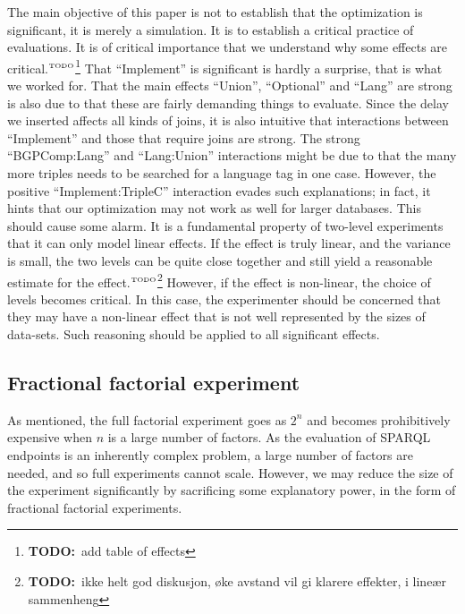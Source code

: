 \documentclass{article}
\newcommand{\todo}[1]{\ensuremath{^{\textrm{\tiny{TODO}\normalsize}}}\footnote{\textbf{TODO:}~#1}}
\begin{document}
The main objective of this paper is not to establish that the
optimization is significant, it is merely a simulation. It is to
establish a critical practice of evaluations. It is of critical
importance that we understand why some effects are critical.\todo{add
  table of effects} That
``Implement'' is significant is hardly a surprise, that is what we
worked for. That the main effects ``Union'', ``Optional'' and ``Lang''
are strong is also due to that these are fairly demanding things to
evaluate. Since the delay we inserted affects all kinds of joins, it
is also intuitive that interactions between ``Implement'' and those
that require joins are strong. The strong ``BGPComp:Lang'' and
``Lang:Union'' interactions might be due to that the many more triples
needs to be searched for a language tag in one case. However, the
positive ``Implement:TripleC'' interaction evades such explanations;
in fact, it hints that our optimization may not work as well for
larger databases. This should cause some alarm. It is a fundamental
property of two-level experiments that it can only model linear
effects. If the effect is truly linear, and the variance is small, the
two levels can be quite close together and still yield a reasonable
estimate for the effect.\todo{ikke helt god diskusjon, øke avstand vil
gi klarere effekter, i lineær sammenheng} However, if the effect is non-linear, the
choice of levels becomes critical. In this case, the experimenter
should be concerned that they may have a non-linear effect that is not
well represented by the sizes of data-sets. Such reasoning should be
applied to all significant effects.



\subsection{Fractional factorial experiment}

As mentioned, the full factorial experiment goes as $2^n$ and becomes
prohibitively expensive when $n$ is a large number of
factors. As the evaluation of SPARQL endpoints is an inherently complex
problem, a large number of factors are needed, and so full experiments
cannot scale. However, we may reduce the size of the experiment
significantly by sacrificing some explanatory power, in the form of
fractional factorial experiments. 
\end{document}
